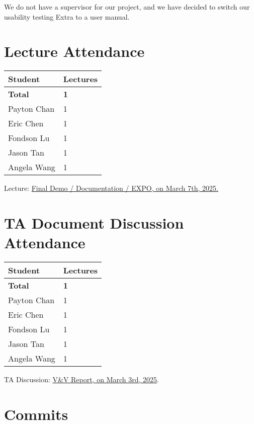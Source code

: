 \documentclass{article}
\begin{document}
We do not have a supervisor for our project, and we have decided to switch our
usability testing Extra to a user manual.

\section{Lecture Attendance}

\begin{table}[H]
    \centering
    \begin{tabular}{ll}
    \toprule
    \textbf{Student} & \textbf{Lectures}\\
    \midrule
    \textbf{Total} & \textbf{1}\\
    Payton Chan & 1\\
    Eric Chen & 1\\
    Fondson Lu & 1\\
    Jason Tan & 1\\
    Angela Wang & 1\\
    \bottomrule
    \end{tabular}
\end{table}

Lecture: \href{https://github.com/PlutosCapstone/Plutos/issues/257}{Final Demo /
Documentation / EXPO, on March 7th, 2025.}

\section{TA Document Discussion Attendance}

\begin{table}[H]
    \centering
    \begin{tabular}{ll}
    \toprule
    \textbf{Student} & \textbf{Lectures}\\
    \midrule
    \textbf{Total} & \textbf{1}\\
    Payton Chan & 1\\
    Eric Chen & 1\\
    Fondson Lu & 1\\
    Jason Tan & 1\\
    Angela Wang & 1\\
    \bottomrule
    \end{tabular}
\end{table}

TA Discussion: \href{https://github.com/PlutosCapstone/Plutos/issues/284}{V\&V Report, on March 3rd, 2025}. 


\section{Commits}
\end{document}
